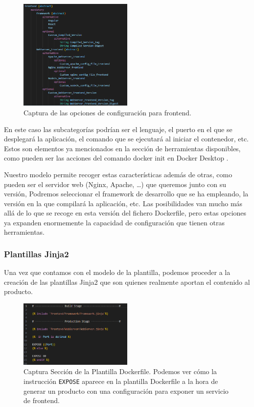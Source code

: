\documentclass[12pt, a4paper, twoside]{article}
\begin{document}
\begin{figure}[h]
	\centering
	  \includegraphics[width=0.5\textwidth]{Dockerfile.frontend.png}
	\caption{Captura de las opciones de configuración para frontend.}
\end{figure}

En este caso las subcategorías podrían ser el lenguaje, el puerto en el que se desplegará la aplicación, el comando que se ejecutará al iniciar el contenedor, etc.
Estos son elementos ya mencionados en la sección de herramientas disponibles, como pueden ser las acciones del comando docker init en Docker Desktop \cite{docker_desktop}.  

Nuestro modelo permite recoger estas características además de otras,
como pueden ser el servidor web (Nginx, Apache, \ldots) que queremos junto con su versión, Podremos seleccionar el framework de desarrollo que se ha empleando, la versión en la que compilará la aplicación, etc.
Las posibilidades van mucho más allá de lo que se recoge en esta versión del fichero Dockerfile, pero estas opciones ya expanden enormemente la capacidad de configuración que tienen otras herramientas. 



\subsubsection{Plantillas Jinja2}
Una vez que contamos con el modelo de la plantilla, podemos proceder a la creación de las plantillas Jinja2 que son quienes realmente aportan el contenido al producto.

\begin{figure}[h]
	\centering
	  \includegraphics[width=0.5\textwidth]{Dockerfile.frontend.jinja.template.png}
	\caption{Captura Sección de la Plantilla Dockerfile. Podemos ver cómo la instrucción \texttt{EXPOSE} aparece en la plantilla Dockerfile a la hora de generar un producto con una configuración para exponer un servicio de frontend.}   
\end{figure}
\end{document}
